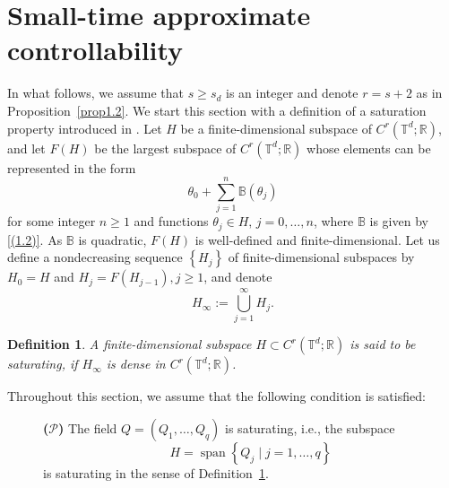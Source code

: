 \documentclass[review]{elsarticle}
\newtheorem{definition}{Definition}[section]
\theoremstyle{dotless}
\def \geq{\geqslant}
\numberwithin{equation}{section}
\begin{document}
\section{Small-time approximate controllability}\label{sec:Approximate controllability}
In what follows, we assume that $s \geq s_d$ is an integer and denote $r=s+2$ as in Proposition~\ref{prop1.2}. 
We start this section with a definition of a saturation property introduced in \cite{Duca_EMS}. 
Let $H$ be a finite-dimensional subspace of $C^r\left(\mathbb{T}^d ; \mathbb{R}\right)$, and let $F(H)$ be the largest subspace of $C^r\left(\mathbb{T}^d ; \mathbb{R}\right)$ whose elements can be represented in the form
$$
\theta_0+\sum_{j=1}^n \mathbb{B}\left(\theta_j\right)
$$
for some integer $n \geq 1$ and functions $\theta_j \in H,\, j=0, \ldots, n$, where $\mathbb{B}$ is given by \eqref{(1.2)}. As $\mathbb{B}$ is quadratic, $F(H)$ is well-defined and finite-dimensional. 
Let us define a nondecreasing sequence $\left\{H_j\right\}$ of finite-dimensional subspaces by $H_0=H$ and $H_j=F\left(H_{j-1}\right), j \geq 1$, and denote
\begin{equation*}\label{(2.1)}
H_{\infty}:=\bigcup_{j=1}^{\infty} H_j .
\end{equation*}
\begin{definition}\label{def2.1}
A finite-dimensional subspace $H \subset C^r\left(\mathbb{T}^d ; \mathbb{R}\right)$ is said to be saturating, if $H_{\infty}$ is dense in $C^r\left(\mathbb{T}^d ; \mathbb{R}\right)$.
\end{definition}
Throughout this section, we assume that the following condition is satisfied:
\begin{description}\item[\hypertarget{H1}]{\textbf{($\mathscr{P}$)}}  
The field $Q=(Q_1, \ldots, Q_q) $ is saturating, i.e., the subspace $$H=\operatorname{span}\left\{Q_j\mid j=1, \ldots, q\right\}$$ is saturating in the sense of Definition~\ref{def2.1}.
\end{description}  
\end{document}

